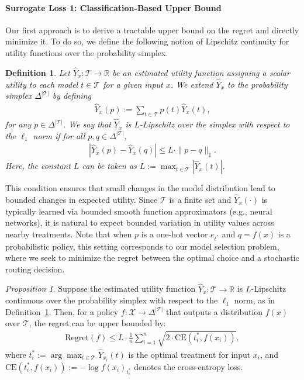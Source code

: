 \documentclass{article}
\newtheorem{definition}{Definition}
\theoremstyle{remark}
\newtheorem{proposition}{Proposition}
\begin{document}
\paragraph{Surrogate Loss 1: Classification-Based Upper Bound}


Our first approach is to derive a tractable upper bound on the regret and directly minimize it. To do so, we define the following notion of Lipschitz continuity for utility functions over the probability simplex.

\begin{definition}\label{def:lip}
Let $\hat{Y}_x : \mathcal{T} \to \mathbb{R}$ be an estimated utility function assigning a scalar utility to each model $t \in \mathcal{T}$ for a given input $x$. We extend $\hat{Y}_x$ to the probability simplex $\Delta^{|\mathcal{T}|}$ by defining
\begin{align}
\hat{Y}_x(p) := \sum_{t \in \mathcal{T}} p(t) \hat{Y}_x(t),
\end{align}
for any $p \in \Delta^{|\mathcal{T}|}$. We say that $\hat{Y}_x$ is $L$-Lipschitz over the simplex with respect to the $\ell_1$ norm if for all $p, q \in \Delta^{|\mathcal{T}|}$,
\begin{align}
|\hat{Y}_x(p) - \hat{Y}_x(q)| \leq L \cdot \|p - q\|_1.
\end{align}
Here, the constant $L$ can be taken as \( L := \max_{t \in \mathcal{T}} |\hat{Y}_x(t)| \). 
\end{definition}

This condition ensures that small changes in the model distribution lead to bounded changes in expected utility. Since $\mathcal{T}$ is a finite set and $\hat{Y}_x(\cdot)$ is typically learned via bounded smooth function approximators (e.g., neural networks), it is natural to expect bounded variation in utility values across nearby treatments. Note that when $p$ is a one-hot vector $e_{t^*}$ and $q = f(x)$ is a probabilistic policy, this setting corresponds to our model selection problem, where we seek to minimize the regret between the optimal choice and a stochastic routing decision.

\begin{proposition}
\label{prop:regret_ce_bound}
Suppose the estimated utility function $\hat{Y}_x : \mathcal{T} \to \mathbb{R}$ is $L$-Lipschitz continuous over the probability simplex with respect to the $\ell_1$ norm, as in Definition~\ref{def:lip}. Then, for a policy $f : \mathcal{X} \to \Delta^{|\mathcal{T}|}$ that outputs a distribution $f(x)$ over $\mathcal{T}$, the regret can be upper bounded by:
\begin{align}
    \text{Regret}(f) \leq L \cdot \frac{1}{n} \sum_{i=1}^n \sqrt{2 \cdot \text{CE}(t_i^*, f(x_i))},
\end{align}
where $t_i^* := \arg\max_{t \in \mathcal{T}} \hat{Y}_{x_i}(t)$ is the optimal treatment for input $x_i$, and $\text{CE}(t_i^*, f(x_i)) := -\log f(x_i)_{t_i^*}$ denotes the cross-entropy loss.
\end{proposition}
\end{document}
